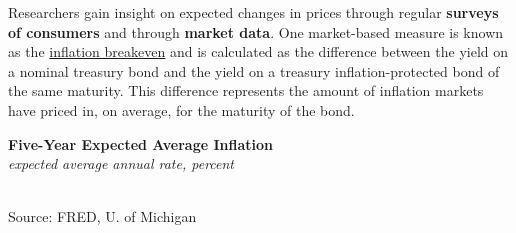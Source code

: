 \documentclass{report}
\makeatletter
\newcommand{\tbllink}[1]{\href{https://raw.githubusercontent.com/bdecon/US-chartbook/master/chartbook/data/#1}{\faTable}}
\newcommand*\short[1]{\expandafter\@gobbletwo\number\numexpr#1\relax}
\newcommand{\absnode}[3]{\node[below right, align=left] at (axis cs: #1,#2) {#3};}
\newcommand{\ltdateaxisticks}{
		date coordinates in=x, axis line style={draw=none},
		xmax={2023-11-01},
		max space between ticks=40,	    
		xtick={{2013-01-01}, {2014-01-01}, {2015-01-01}, {2016-01-01}, {2017-01-01}, {2018-01-01}, 
		    {2019-01-01}, {2020-01-01}, {2021-01-01}, {2022-01-01}, {2023-01-01}, {2024-01-01}},
		enlarge y limits={0.06}, enlarge x limits={0.01},
		}
\newcommand{\bbar}[2]{extra #1 ticks = {{#2}}, extra #1 tick labels = ,
		extra #1 tick style = {grid=major, grid style={thick, black!25}},}
\newcommand{\stdline}[4]{\addplot[very thick, no markers, color=#1] 
		table [x=#2, y=#3, col sep=comma] {#4};	}
\newcommand{\thinline}[4]{\addplot[no markers, color=#1] 
		table [x=#2, y=#3, col sep=comma] {#4};	}
\newcommand{\rbar}{
		\fill[color=black!10] (axis cs:{2020-02-01},\pgfkeysvalueof{/pgfplots/ymin}) rectangle 
			(axis cs:{2020-05-01}, \pgfkeysvalueof{/pgfplots/ymax});}
\makeatother
\begin{document}
{{\begin{minipage}{0.76\textwidth}
\small Researchers gain insight on expected changes in prices through regular \textbf{surveys of consumers} and through \textbf{market data}. One market-based measure is known as the \href{https://fred.stlouisfed.org/series/T5YIE}{inflation breakeven} and is calculated as the difference between the yield on a nominal treasury bond and the yield on a treasury inflation-protected bond of the same maturity. This difference represents the amount of inflation markets have priced in, on average, for the maturity of the bond.
\end{minipage}
\vspace*{-1mm}

\begin{minipage}{0.39\textwidth}
\normalsize \textbf{Five-Year Expected Average Inflation}\\
\footnotesize{\textit{expected average annual rate, percent}}\\
\hspace*{-2mm} \\
\footnotesize{Source: FRED, U. of Michigan} \hfill \tbllink{infbreak.csv} \ \ 
\vspace{1mm}

\end{minipage} \hspace{4mm} 
\begin{minipage}{0.33\textwidth}
\small 


\end{minipage}
\vspace{1mm}

\begin{minipage}{0.76\textwidth}


\end{minipage}}}
\end{document}
